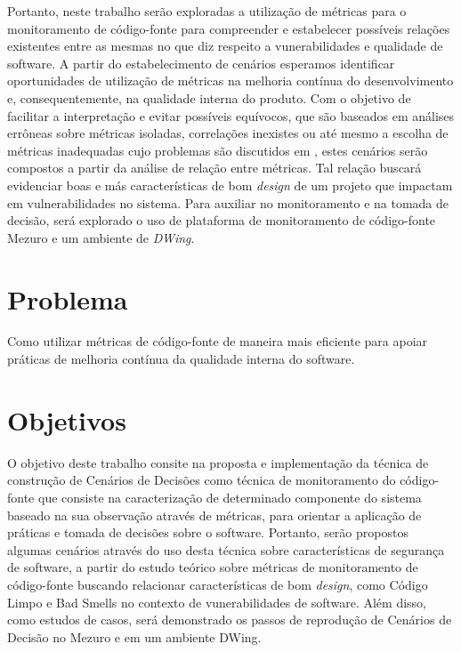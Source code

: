 %

Portanto, neste trabalho serão exploradas a utilização de métricas para o monitoramento de código-fonte para compreender e estabelecer possíveis relações existentes entre as mesmas no que diz respeito a vunerabilidades e qualidade de software. A partir do estabelecimento de cenários esperamos identificar oportunidades de utilização de métricas na melhoria contínua do desenvolvimento e, consequentemente, na qualidade interna do produto. Com o objetivo de facilitar a interpretação e evitar possíveis equívocos, que são baseados em análises errôneas sobre métricas isoladas, correlações inexistes ou até mesmo a escolha de métricas inadequadas cujo problemas são discutidos em \cite{chidamber1994}, estes cenários serão compostos a partir da análise de relação entre métricas. Tal relação buscará evidenciar boas e más características de bom \emph{design} de um projeto que impactam em vulnerabilidades no sistema.
%
Para auxiliar no monitoramento e na tomada de decisão, será explorado o uso de plataforma de monitoramento de código-fonte Mezuro e um ambiente de \emph{DWing}.



\section{Problema}

%
Como utilizar métricas de código-fonte de maneira mais eficiente para apoiar práticas de melhoria contínua da qualidade interna do software.

\section{Objetivos}

O objetivo deste trabalho consite na proposta e implementação da técnica de construção de Cenários de Decisões como técnica de monitoramento do código-fonte que consiste na caracterização de determinado componente do sistema baseado na sua observação através de métricas, para orientar a aplicação de práticas e tomada de decisões sobre o software. Portanto, serão propostos algumas cenários através do uso desta técnica sobre características de segurança de software, a partir do estudo teórico sobre métricas de monitoramento de código-fonte buscando relacionar características de bom \emph{design}, como Código Limpo e Bad Smells no contexto de vunerabilidades de software. Além disso, como estudos de casos, será demonstrado os passos de reprodução de Cenários de Decisão no Mezuro e em um ambiente DWing.

